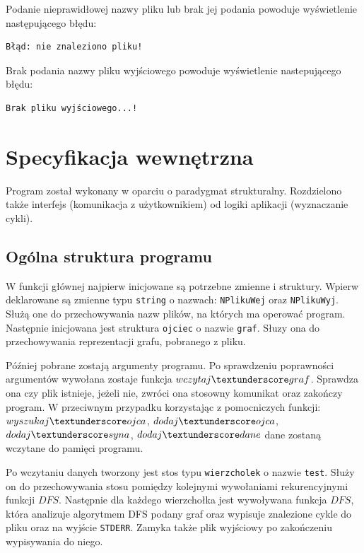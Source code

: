 \documentclass[12pt,a4paper]{article}
\begin{document}
Podanie nieprawidłowej nazwy pliku lub brak jej podania powoduje wyświetlenie następującego błędu:
\begin{verbatim}
Błąd: nie znaleziono pliku!
\end{verbatim}

Brak podania nazwy pliku wyjściowego powoduje wyświetlenie nastepującego błędu:

\begin{verbatim}
Brak pliku wyjściowego...!
\end{verbatim}


\section{Specyfikacja wewnętrzna}\label{sec:sp-wew}
Program został wykonany w oparciu o paradygmat strukturalny. Rozdzielono także interfejs (komunikacja z użytkownikiem) od logiki aplikacji (wyznaczanie cykli).

\subsection{Ogólna struktura programu}
W funkcji głównej najpierw inicjowane są potrzebne zmienne i struktury. Wpierw deklarowane są zmienne typu \texttt{string} o nazwach: 
\texttt{NPlikuWej} oraz \texttt{NPlikuWyj}. Służą one do przechowywania nazw plików, na których ma operować program.
Następnie inicjowana jest struktura \texttt{ojciec} o nazwie \texttt{graf}. Słuzy ona do przechowywania reprezentacji grafu, pobranego z pliku.

Później pobrane zostają argumenty programu. Po sprawdzeniu poprawności argumentów wywołana zostaje funkcja $wczytaj \textunderscore graf$. Sprawdza ona czy plik istnieje, jeżeli nie, zwróci ona stosowny
komunikat oraz zakończy program. W przeciwnym przypadku korzystając z pomocniczych funkcji: $wyszukaj \textunderscore ojca$, $dodaj \textunderscore ojca$, $dodaj \textunderscore syna$, $dodaj \textunderscore dane$ dane zostaną wczytane do pamięci programu.

Po wczytaniu danych tworzony jest stos typu \texttt{wierzcholek} o nazwie \texttt{test}. Służy on do przechowywania stosu pomiędzy kolejnymi wywołaniami rekurencyjnymi funkcji $DFS$.
Następnie dla każdego wierzchołka jest wywoływana funkcja $DFS$, która analizuje algorytmem DFS podany graf oraz wypisuje znalezione cykle do pliku oraz na wyjście \texttt{STDERR}. Zamyka także plik wyjściowy
po zakończeniu wypisywania do niego.
\end{document}
